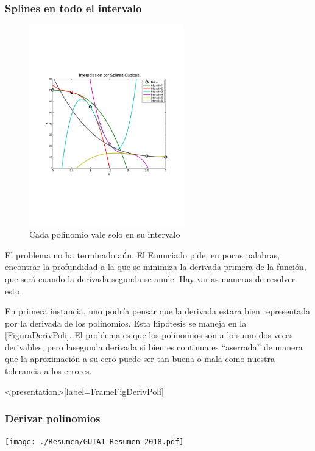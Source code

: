 \begin{frame}[label=FrameFiguraSplinesExtendidos]
  \frametitle<presentation>{Splines en todo el intervalo}
  \begin{figure}
    \center
    \includegraphics[width=0.6\textwidth,trim=1cm 7cm 1cm 6cm]{./scplines.pdf}
    \caption{\label{FiguraSplinesExtendidos} Cada polinomio vale solo en su intervalo}
  \end{figure}
\end{frame}

El problema no ha terminado aún. El Enunciado pide, en pocas palabras,
encontrar la profundidad a la que se minimiza la derivada primera
de la función, que será cuando la derivada segunda se anule.
Hay varias maneras de resolver esto. 

En primera instancia, uno podría pensar que la derivada estara bien
representada por la derivada de los polinomios. Esta hipótesis se 
maneja en la \autoref{FiguraDerivPoli}. El problema es que los
polinomios son a lo sumo dos veces derivables, pero lasegunda derivada
si bien es continua es ``aserrada'' de manera que la aproximación
a su cero puede ser tan buena o mala como nuestra tolerancia a
los errores.

\begin{figure}
  \caption{\protect\label{FiguraDerivPoli}}
\end{figure}

\mode*
\begin{frame}<presentation>[label=FrameFigDerivPoli]
  \frametitle{Derivar polinomios}
  \center
  \texttt{[image: ./Resumen/GUIA1-Resumen-2018.pdf]}

\end{frame}


